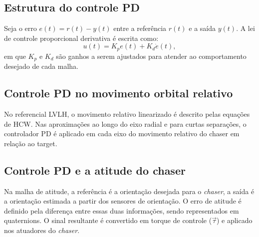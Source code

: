 \subsection{Estrutura do controle PD}
Seja o erro $e(t)=r(t)-y(t)$ entre a referência $r(t)$ e a saída $y(t)$.
A lei de controle proporcional derivativa é escrita como:
\begin{equation}
\label{eq:pd_law}
u(t) = K_p e(t) + K_d \dot e(t),
\end{equation}
em que $K_p$ e $K_d$ são ganhos a serem ajustados para atender ao comportamento desejado de cada malha.

\subsection{Controle PD no movimento orbital relativo}
No referencial LVLH, o movimento relativo linearizado é descrito pelas equações de HCW.  
Nas aproximações ao longo do eixo radial e para curtas separações, o controlador PD é aplicado em cada eixo do movimento relativo do chaser em relação ao target.

\subsection{Controle PD e a atitude do chaser}
Na malha de atitude, a referência é a orientação desejada para o \emph{chaser}, a saída é a orientação estimada a partir dos sensores de orientação.
O erro de atitude é definido pela diferença entre essas duas informações, sendo representados em quaternions.
O sinal resultante é convertido em torque de controle ($\vec \tau$) e aplicado nos atuadores do \emph{chaser}.

